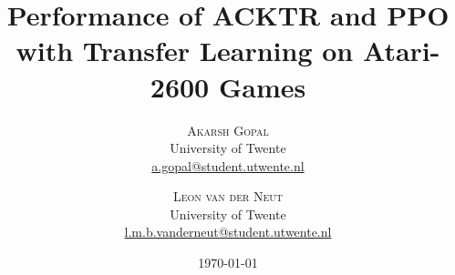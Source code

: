 \usepackage{fancyhdr} %
\pagestyle{fancy} %
\fancyhead{} %
\fancyfoot{} %
\fancyfoot[RO,LE]{\thepage} %

\usepackage{titling} %

\usepackage{hyperref} %


\setlength{\droptitle}{-4\baselineskip} %

\pretitle{\begin{center}\Huge\bfseries} %
\posttitle{\end{center}} %
\title{Performance of ACKTR and PPO with Transfer Learning on Atari-2600 Games} %
\author{%
\textsc{Akarsh Gopal}\\[1ex] %
\normalsize University of Twente \\ %
\normalsize \href{mailto:a.gopal@student.utwente.nl}{a.gopal@student.utwente.nl} %
\and %
\textsc{Leon van der Neut}\\[1ex] %
\normalsize University of Twente \\ %
\normalsize \href{mailto:l.m.b.vanderneut@student.utwente.nl }{l.m.b.vanderneut@student.utwente.nl } %
}
\date{\today} %
\renewcommand{\maketitlehookd}{%
\begin{abstract}
\noindent In this paper, empirical research is conducted on the effects of Transfer Learning on the performance of two state-of-the-art Reinforcement Learning algorithms in a diverse set of tasks. This is carried out using open-source high-quality implementations of the algorithms presented by OpenAI in Baselines (OpenAIa, 2018). This research intends to develop insights into the effects Transfer Learning bears on the performance of these algorithms and the methodology of research that could be followed to conduct studies which hold significance. The results show positive effects of Transfer Learning on particular source and target task combinations, while also showing negative effects on other combinations. In general, the results show that it is not straightforward to predict when transfer learning will prove beneficial for Reinforcement Learning. 
\end{abstract}
}

